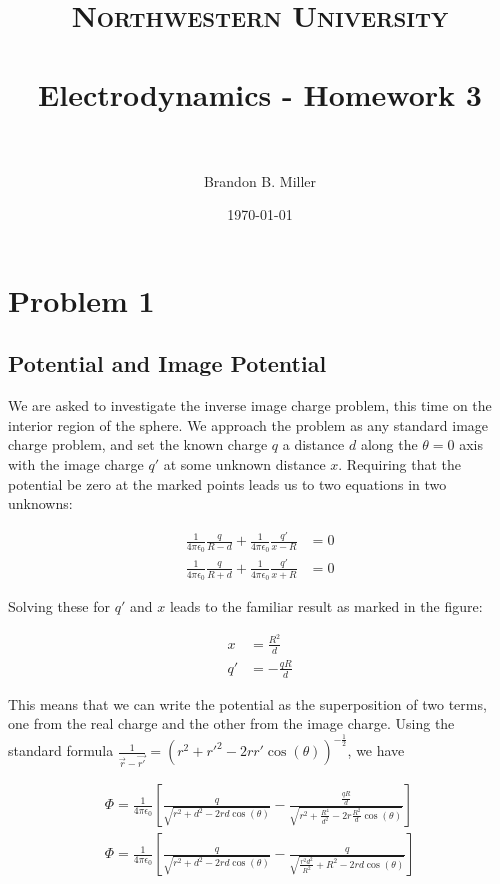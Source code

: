\documentclass[paper=a4, fontsize=11pt]{scrartcl} %
\title{	
\normalfont \normalsize 
\textsc{Northwestern University} \\ [25pt] %
\horrule{0.5pt} \\[0.4cm] %
\huge Electrodynamics - Homework 3 \\ %
\horrule{2pt} \\[0.5cm] %
}
\author{Brandon B. Miller} %
\date{\normalsize\today} %
\numberwithin{equation}{section} %
\numberwithin{figure}{section} %
\numberwithin{table}{section} %
\begin{document}
\maketitle %

\section{Problem 1}

\subsection{Potential and Image Potential}

We are asked to investigate the inverse image charge problem, this time on the interior region of the sphere. We approach the problem as any standard image charge problem, and set the known charge $q$ a distance $d$ along the $\theta = 0$ axis with the image charge $q'$ at some unknown distance $x$. Requiring that the potential be zero at the marked points leads us to two equations in two unknowns:

\begin{align}
\frac{1}{4 \pi \epsilon_0}\frac{q}{R - d} + \frac{1}{4 \pi \epsilon_0}\frac{q'}{x - R} &= 0 \\
\frac{1}{4 \pi \epsilon_0}\frac{q}{R + d} + \frac{1}{4 \pi \epsilon_0}\frac{q'}{x + R} &= 0
\end{align}  

Solving these for $q'$ and $x$ leads to the familiar result as marked in the figure:

\begin{align}
x &= \frac{R^2}{d} \\
q' &= -\frac{q R}{d}
\end{align}

This means that we can write the potential as the superposition of two terms, one from the real charge and the other from the image charge. Using the standard formula $\frac{1}{\vec{r} - \vec{r'}} = (r^2 + r'^2 - 2rr'\cos(\theta))^{-\frac{1}{2}}$, we have

\begin{align}
\Phi = \frac{1}{4 \pi \epsilon_0}\left[\frac{q}{\sqrt{r^2 + d^2 - 2 r d \cos(\theta)}} - \frac{\frac{qR}{d}}{\sqrt{r^2 + \frac{R^4}{d^2} - 2 r \frac{R^2}{d}\cos(\theta)}}\right] \\
\Phi = \frac{1}{4 \pi \epsilon_0}\left[\frac{q}{\sqrt{r^2 + d^2 - 2 r d \cos(\theta)}} - \frac{q}{\sqrt{\frac{r^2d^2}{R^2} + R^2 - 2 r d\cos(\theta)}}\right]\\ 
\end{align}
\end{document}
